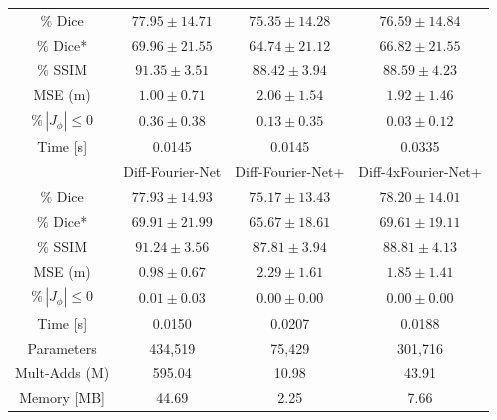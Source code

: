 \documentclass[english,version-2022-01]{uzl-thesis} %
\begin{document}
\begin{table}[H]
\begin{tabular}{c c c c}
		\midrule
		$\%$ Dice & $77.95 \pm 14.71$ & $75.35 \pm 14.28$ & $76.59 \pm 14.84$\\
		$\%$ Dice* & $69.96 \pm 21.55$ & $64.74 \pm 21.12$ & $66.82 \pm 21.55$ \\
		$\%$ SSIM & $91.35 \pm 3.51$ & $88.42 \pm 3.94$ & $88.59 \pm 4.23$\\
		MSE (m) & $1.00 \pm 0.71$ & $2.06 \pm 1.54$ & $1.92 \pm 1.46$ \\
		$\% \, |J_{\phi}|\leq0$ & $0.36 \pm 0.38$ & $0.13 \pm 0.35$ & $0.03 \pm 0.12$ \\
		Time [s] & 0.0145 & 0.0145 & 0.0335 \\
		\midrule
		 & Diff-Fourier-Net & Diff-Fourier-Net+ & Diff-4xFourier-Net+\\		
		\midrule
		$\%$ Dice & $77.93 \pm 14.93$ & $75.17 \pm 13.43$ & $78.20 \pm 14.01$\\
		$\%$ Dice* & $69.91 \pm 21.99$ & $65.67 \pm 18.61$ & $69.61 \pm 19.11$ \\
		$\%$ SSIM & $91.24 \pm 3.56$ & $87.81 \pm 3.94$ & $88.81 \pm 4.13$\\
		MSE (m) & $0.98 \pm 0.67$ & $2.29 \pm 1.61$ & $1.85 \pm 1.41$ \\
		$\% \, |J_{\phi}|\leq0$ & $0.01 \pm 0.03$ & $0.00 \pm 0.00$ & $0.00 \pm 0.00$ \\
		Time [s] 	  & 0.0150  & 0.0207 & 0.0188 \\
		\midrule
		Parameters    & 434,519 & 75,429 & 301,716 \\
		Mult-Adds (M) & 595.04  & 10.98  & 43.91 \\
		Memory [MB]   & 44.69   & 2.25   & 7.66 \\
		\bottomrule
	\end{tabular}	
\end{table}
\end{document}
